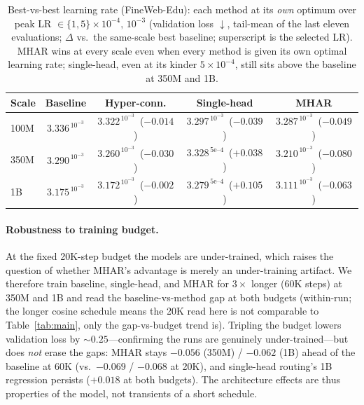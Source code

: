 \documentclass{article}
\begin{document}
\begin{table}[h]
\centering
\caption{Best-vs-best learning rate (FineWeb-Edu): each method at its \emph{own} optimum over peak
LR $\in\{1,5\}{\times}10^{-4},\,10^{-3}$ (validation loss $\downarrow$, tail-mean of
the last eleven evaluations; $\Delta$ vs.\ the same-scale best baseline; superscript
is the selected LR). MHAR wins at every scale even when every method is given its
own optimal learning rate; single-head, even at its kinder $5\times10^{-4}$, still
sits above the baseline at 350M and 1B.}
\label{tab:lrsweep}
\begin{tabular}{lcccc}
\toprule
\textbf{Scale} & \textbf{Baseline} & \textbf{Hyper-conn.} & \textbf{Single-head} & \textbf{MHAR} \\
\midrule
100M & $3.336^{\,10^{-3}}$ & $3.322^{\,10^{-3}}$ \,($-0.014$) & $3.297^{\,10^{-3}}$ \,($-0.039$) & $\mathbf{3.287}^{\,10^{-3}}$ \,($-0.049$) \\
350M & $3.290^{\,10^{-3}}$ & $3.260^{\,10^{-3}}$ \,($-0.030$) & $3.328^{\,5\text{e--}4}$ \,($+0.038$) & $\mathbf{3.210}^{\,10^{-3}}$ \,($-0.080$) \\
1B   & $3.175^{\,10^{-3}}$ & $3.172^{\,10^{-3}}$ \,($-0.002$) & $3.279^{\,5\text{e--}4}$ \,($+0.105$) & $\mathbf{3.111}^{\,10^{-3}}$ \,($-0.063$) \\
\bottomrule
\end{tabular}
\end{table}

\paragraph{Robustness to training budget.} At the fixed 20K-step budget the models
are under-trained, which raises the question of whether MHAR's advantage is
merely an under-training artifact. We therefore train baseline, single-head, and
MHAR for $3\times$ longer (60K steps) at 350M and 1B and read the
baseline-vs-method gap at both budgets (within-run; the longer cosine schedule means
the 20K read here is not comparable to Table~\ref{tab:main}, only the gap-vs-budget
trend is). Tripling the budget lowers validation loss by ${\sim}0.25$---confirming
the runs are genuinely under-trained---but does \emph{not} erase the gaps: MHAR
stays $-0.056$ (350M) / $-0.062$ (1B) ahead of the baseline at 60K (vs.\ $-0.069$ /
$-0.068$ at 20K), and single-head routing's 1B regression persists ($+0.018$ at both
budgets). The architecture effects are thus properties of the model, not transients
of a short schedule.
\end{document}
